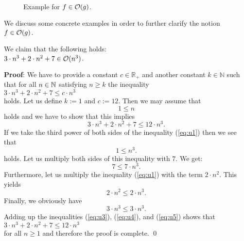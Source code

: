 \begin{figure}[!ht]
  \centering
  \caption{Example for $f \in \mathcal{O}(g)$.} 
  \label{fig:big-o.eps}
\end{figure}


\noindent
We discuss some concrete examples in order to further clarify the notion $f \in \mathcal{O}(g)$.

\example
We claim that the following holds:
\\[0.2cm]
\hspace*{1.3cm}
$3 \cdot n^3 + 2 \cdot n^2 + 7 \in \mathcal{O}(n^3)$. 
\ex

\noindent
\textbf{Proof}:  We have to  provide a constant $c\in\mathbb{R}_+$ and another constant $k\in\mathbb{N}$ such that for all $n\in
{\mathbb N}$ satisfying
$n \geq k$ the inequality
\\[0.2cm]
\hspace*{1.3cm} 
$3 \cdot n^3 + 2 \cdot n^2 + 7 \leq c \cdot n^3$
\\[0.2cm]
holds.  Let us define  $k := 1$ and $c := 12$.  Then we may assume that 
\begin{equation}
  \label{eq:u1}
  1\leq n  
\end{equation}
holds and we have to show that this implies 
\begin{equation}
  \label{eq:u2}
  3 \cdot n^3 + 2 \cdot n^2 + 7 \leq 12 \cdot n^3.
\end{equation}
If we take the third power of both sides of the inequality (\ref{eq:u1}) then we see that
\begin{equation}
  \label{eq:u3pre}
  1 \leq n^3.
\end{equation}
holds.  Let us multiply both sides of this inequality with $7$.  We get: 
\begin{equation}
  \label{eq:u3}
  7 \leq 7 \cdot n^3.
\end{equation}
Furthermore, let us multiply the inequality (\ref{eq:u1}) with the term $2\cdot n^2$.  This yields
\begin{equation}
  \label{eq:u4}
  2 \cdot n^2 \leq 2 \cdot n^3.
\end{equation}
Finally, we obviously have
\begin{equation}
  \label{eq:u5}
  3 \cdot n^3 \leq 3 \cdot n^3.
\end{equation}
Adding up the inequalities (\ref{eq:u3}), (\ref{eq:u4}), and (\ref{eq:u5}) shows that \\[0.2cm]
\hspace*{1.3cm} $3 \cdot n^3 + 2 \cdot n^2 + 7 \leq 12 \cdot n^3$ \\[0.2cm]
for all $n \geq 1$ and therefore the proof is complete. \qed

